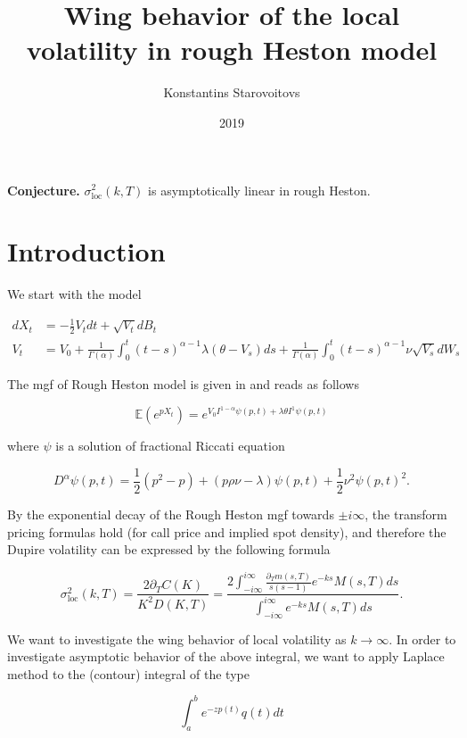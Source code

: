 \documentclass[12pt]{article}
\title{Wing behavior of the local volatility in rough Heston model}
\author{Konstantins Starovoitovs}
\date{2019}
\begin{document}
\textbf{Conjecture.} $\sigma _ { \mathrm { loc } } ^ { 2 } ( k , T )$ is asymptotically linear in rough Heston.

\section{Introduction}

We start with the model

$$
\begin{aligned} d X _ { t } & = - \frac { 1 } { 2 } V _ { t } d t + \sqrt { V _ { t } } d B _ { t } \\ V _ { t } & = V _ { 0 } + \frac { 1 } { \Gamma ( \alpha ) } \int _ { 0 } ^ { t } ( t - s ) ^ { \alpha - 1 } \lambda \left( \theta - V _ { s } \right) d s + \frac { 1 } { \Gamma ( \alpha ) } \int _ { 0 } ^ { t } ( t - s ) ^ { \alpha - 1 } \nu \sqrt { V _ { s } } d W _ { s } \end{aligned}
$$

The mgf of Rough Heston model is given in \cite{FGS19} and reads as follows

$$
\mathbb { E } \left( e ^ { p X _ { t } } \right) = e ^ { V _ { 0 } I ^ { 1 - \alpha } \psi ( p , t ) + \lambda \theta I ^ { 1 } \psi ( p , t ) }
$$

where $\psi$ is a solution of fractional Riccati equation

$$
D ^ { \alpha } \psi ( p , t ) = \frac { 1 } { 2 } \left( p ^ { 2 } - p \right) + ( p \rho \nu - \lambda ) \psi ( p , t ) + \frac { 1 } { 2 } \nu ^ { 2 } \psi ( p , t ) ^ { 2 }.
$$

By the exponential decay of the Rough Heston mgf towards $\pm i\infty$, the transform pricing formulas hold (for call price and implied spot density), and therefore the Dupire volatility can be expressed by the following formula

$$
\sigma _ { \mathrm { loc } } ^ { 2 } ( k , T ) = \frac { 2 \partial _ { T } C ( K ) } { K ^ { 2 } D ( K , T ) } = \frac { 2 \int _ { - i \infty } ^ { i \infty } \frac { \partial _ { T } m ( s , T ) } { s ( s - 1 ) } e ^ { - k s } M ( s , T ) d s } { \int _ { - i \infty } ^ { i \infty } e ^ { - k s } M ( s , T ) d s }.
$$

We want to investigate the wing behavior of local volatility as $k \rightarrow \infty$. In order to investigate asymptotic behavior of the above integral, we want to apply Laplace method to the (contour) integral of the type

$$
\int _ { a } ^ { b } e ^ { - z p ( t ) } q ( t ) d t
$$
\end{document}
